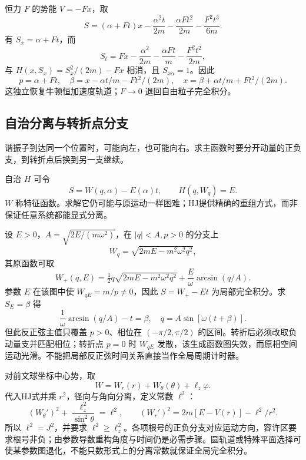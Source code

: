 \begin{example}[恒力的完全积分与两个初值]
恒力 $F$ 的势能 $V=-Fx$，取
\[
S=(\alpha+Ft)x-\frac{\alpha^2t}{2m}
-\frac{\alpha Ft^2}{2m}-\frac{F^2t^3}{6m}.
\]
有 $S_x=\alpha+Ft$，而
\[
S_t=Fx-\frac{\alpha^2}{2m}-\frac{\alpha Ft}{m}-\frac{F^2t^2}{2m},
\]
与 $H(x,S_x)=S_x^2/(2m)-Fx$ 相消，且 $S_{x\alpha}=1$。因此
\[
p=\alpha+Ft,\quad\beta=x-\alpha t/m-Ft^2/(2m),
\quad x=\beta+\alpha t/m+Ft^2/(2m).
\]
这独立恢复牛顿恒加速度轨道；$F\to0$ 退回自由粒子完全积分。
\end{example}

\subsection{自治分离与转折点分支}
谐振子到达同一个位置时，可能向左，也可能向右。求主函数时要分开动量的正负支，到转折点后换到另一支继续。

自治 $H$ 可令
\begin{equation}
S=W(q,\alpha)-E(\alpha)t,\qquad H(q,W_q)=E.
\label{eq:HJ-time-independent}
\end{equation}
$W$ 称特征函数。求解它仍可能与原运动一样困难；HJ提供精确的重组方式，而非保证任意系统都能显式分离。

\begin{example}[谐振子的一支HJ解为何不覆盖整周期？]
设 $E>0$，$A=\sqrt{2E/(m\omega^2)}$，在 $|q|<A,p>0$ 的分支上
\[
W_q=\sqrt{2mE-m^2\omega^2q^2},
\]
其原函数可取
\[
W_+(q,E)=\tfrac12q\sqrt{2mE-m^2\omega^2q^2}
+\frac E\omega\arcsin(q/A).
\]
参数 $E$ 在该图中使 $W_{qE}=m/p\ne0$，因此 $S=W_+-Et$ 为局部完全积分。求 $S_E=\beta$ 得
\[
\frac1\omega\arcsin(q/A)-t=\beta,
\quad q=A\sin[\omega(t+\beta)].
\]
但此反正弦主值只覆盖 $p>0$、相位在 $(-\pi/2,\pi/2)$ 的区间。转折后必须改取负动量支并匹配相位；转折点 $p=0$ 时 $W_{qE}$ 发散，该生成函数图失效，而原相空间运动光滑。不能把局部反正弦时间关系直接当作全局周期计时器。
\end{example}

\begin{example}[中心势分离常数就是角动量]
对前文球坐标中心势，取
\[
W=W_r(r)+W_\theta(\theta)+\ell_z\varphi.
\]
代入HJ式并乘 $r^2$，径向与角向分离，定义常数 $\ell^2$：
\[
(W_\theta')^2+\frac{\ell_z^2}{\sin^2\theta}=\ell^2,
\qquad
(W_r')^2=2m[E-V(r)]-\ell^2/r^2.
\]
所以 $\ell^2=J^2$，并要求 $\ell^2\ge\ell_z^2$。各项根号的正负分支对应运动方向，容许区要求根号非负；由参数导数重构角度与时间仍是必需步骤。圆轨道或特殊平面选择可使某参数图退化，不能只数形式上的分离常数就保证全局完全积分。
\end{example}



